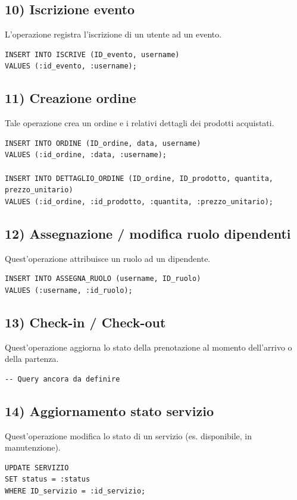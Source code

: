 \documentclass[a4paper,12pt]{report}
\begin{document}
\subsection*{10) Iscrizione evento}
L'operazione registra l’iscrizione di un utente ad un evento.
\begin{verbatim}
INSERT INTO ISCRIVE (ID_evento, username)
VALUES (:id_evento, :username);
\end{verbatim}

\subsection*{11) Creazione ordine}
Tale operazione crea un ordine e i relativi dettagli dei prodotti acquistati.
\begin{verbatim}
INSERT INTO ORDINE (ID_ordine, data, username)
VALUES (:id_ordine, :data, :username);

INSERT INTO DETTAGLIO_ORDINE (ID_ordine, ID_prodotto, quantita, prezzo_unitario)
VALUES (:id_ordine, :id_prodotto, :quantita, :prezzo_unitario);
\end{verbatim}

\subsection*{12) Assegnazione / modifica ruolo dipendenti}
Quest'operazione attribuisce un ruolo ad un dipendente.
\begin{verbatim}
INSERT INTO ASSEGNA_RUOLO (username, ID_ruolo)
VALUES (:username, :id_ruolo);
\end{verbatim}

\subsection*{13) Check-in / Check-out}
Quest'operazione aggiorna lo stato della prenotazione al momento dell’arrivo o della partenza.
\begin{verbatim}
-- Query ancora da definire
\end{verbatim}

\subsection*{14) Aggiornamento stato servizio}
Quest'operazione modifica lo stato di un servizio (es. disponibile, in manutenzione).
\begin{verbatim}
UPDATE SERVIZIO
SET status = :status
WHERE ID_servizio = :id_servizio;
\end{verbatim}
\end{document}
